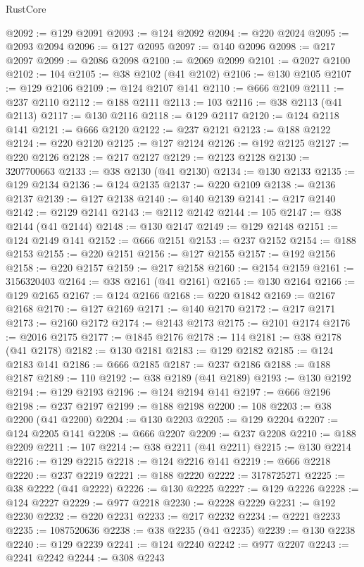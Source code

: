 \begin{lexlean}{RustCore}
\begin{coremodule}
@2092 := @129 @2091
@2093 := @124 @2092
@2094 := @220 @2024
@2095 := @2093 @2094
@2096 := @127 @2095
@2097 := @140 @2096
@2098 := @217 @2097
@2099 := @2086 @2098
@2100 := @2069 @2099
@2101 := @2027 @2100
@2102 := 104
@2105 := @38 @2102 (@41 @2102)
@2106 := @130 @2105
@2107 := @129 @2106
@2109 := @124 @2107 @141
@2110 := @666 @2109
@2111 := @237 @2110
@2112 := @188 @2111
@2113 := 103
@2116 := @38 @2113 (@41 @2113)
@2117 := @130 @2116
@2118 := @129 @2117
@2120 := @124 @2118 @141
@2121 := @666 @2120
@2122 := @237 @2121
@2123 := @188 @2122
@2124 := @220 @2120
@2125 := @127 @2124
@2126 := @192 @2125
@2127 := @220 @2126
@2128 := @217 @2127
@2129 := @2123 @2128
@2130 := 3207700663
@2133 := @38 @2130 (@41 @2130)
@2134 := @130 @2133
@2135 := @129 @2134
@2136 := @124 @2135
@2137 := @220 @2109
@2138 := @2136 @2137
@2139 := @127 @2138
@2140 := @140 @2139
@2141 := @217 @2140
@2142 := @2129 @2141
@2143 := @2112 @2142
@2144 := 105
@2147 := @38 @2144 (@41 @2144)
@2148 := @130 @2147
@2149 := @129 @2148
@2151 := @124 @2149 @141
@2152 := @666 @2151
@2153 := @237 @2152
@2154 := @188 @2153
@2155 := @220 @2151
@2156 := @127 @2155
@2157 := @192 @2156
@2158 := @220 @2157
@2159 := @217 @2158
@2160 := @2154 @2159
@2161 := 3156320403
@2164 := @38 @2161 (@41 @2161)
@2165 := @130 @2164
@2166 := @129 @2165
@2167 := @124 @2166
@2168 := @220 @1842
@2169 := @2167 @2168
@2170 := @127 @2169
@2171 := @140 @2170
@2172 := @217 @2171
@2173 := @2160 @2172
@2174 := @2143 @2173
@2175 := @2101 @2174
@2176 := @2016 @2175
@2177 := @1845 @2176
@2178 := 114
@2181 := @38 @2178 (@41 @2178)
@2182 := @130 @2181
@2183 := @129 @2182
@2185 := @124 @2183 @141
@2186 := @666 @2185
@2187 := @237 @2186
@2188 := @188 @2187
@2189 := 110
@2192 := @38 @2189 (@41 @2189)
@2193 := @130 @2192
@2194 := @129 @2193
@2196 := @124 @2194 @141
@2197 := @666 @2196
@2198 := @237 @2197
@2199 := @188 @2198
@2200 := 108
@2203 := @38 @2200 (@41 @2200)
@2204 := @130 @2203
@2205 := @129 @2204
@2207 := @124 @2205 @141
@2208 := @666 @2207
@2209 := @237 @2208
@2210 := @188 @2209
@2211 := 107
@2214 := @38 @2211 (@41 @2211)
@2215 := @130 @2214
@2216 := @129 @2215
@2218 := @124 @2216 @141
@2219 := @666 @2218
@2220 := @237 @2219
@2221 := @188 @2220
@2222 := 3178725271
@2225 := @38 @2222 (@41 @2222)
@2226 := @130 @2225
@2227 := @129 @2226
@2228 := @124 @2227
@2229 := @977 @2218
@2230 := @2228 @2229
@2231 := @192 @2230
@2232 := @220 @2231
@2233 := @217 @2232
@2234 := @2221 @2233
@2235 := 1087520636
@2238 := @38 @2235 (@41 @2235)
@2239 := @130 @2238
@2240 := @129 @2239
@2241 := @124 @2240
@2242 := @977 @2207
@2243 := @2241 @2242
@2244 := @308 @2243

\end{coremodule}
\end{lexlean}
